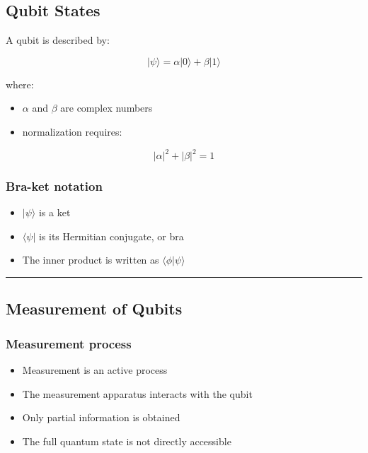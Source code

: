 \documentclass[
]{article}
\providecommand{\tightlist}{%
  \setlength{\itemsep}{0pt}\setlength{\parskip}{0pt}}
\begin{document}
\subsection{Qubit States}\label{qubit-states}

A qubit is described by:

\[
|\psi\rangle = \alpha|0\rangle + \beta|1\rangle
\]

where:

\begin{itemize}
\tightlist
\item
  $\alpha$ and $\beta$ are complex numbers
\item
  normalization requires:
\end{itemize}

\[
|\alpha|^2 + |\beta|^2 = 1
\]

\subsubsection{Bra-ket notation}\label{bra-ket-notation}

\begin{itemize}
\tightlist
\item
  $|\psi\rangle$ is a ket
\item
  $\langle\psi|$ is its Hermitian conjugate, or bra
\item
  The inner product is written as $\langle\phi|\psi\rangle$
\end{itemize}

\begin{center}\rule{0.5\linewidth}{0.5pt}\end{center}

\subsection{Measurement of Qubits}\label{measurement-of-qubits}

\subsubsection{Measurement process}\label{measurement-process}

\begin{itemize}
\tightlist
\item
  Measurement is an active process
\item
  The measurement apparatus interacts with the qubit
\item
  Only partial information is obtained
\item
  The full quantum state is not directly accessible
\end{itemize}
\end{document}
